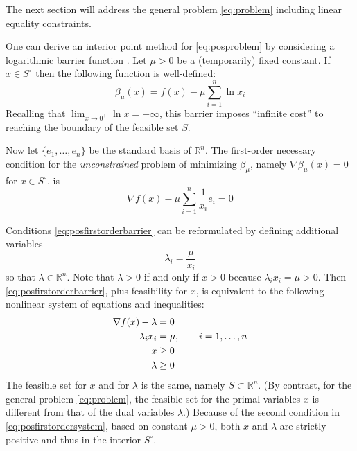 \documentclass[11pt]{article}
\newcommand{\RR}{\mathbb{R}}
\newcommand{\grad}{\nabla}
\begin{document}
The next section will address the general problem \eqref{eq:problem} including linear equality constraints.

One can derive an interior point method for \eqref{eq:posproblem} by considering a logarithmic barrier function \cite[section 16.2]{GrivaNashSofer2009}.  Let $\mu>0$ be a (temporarily) fixed constant.  If $x\in S^\circ$ then the following function is well-defined:
\begin{equation}
\beta_\mu(x) = f(x) - \mu \sum_{i=1}^n \ln x_i \label{eq:posbarrierfunction}
\end{equation}
Recalling that $\lim_{x\to 0^+} \ln x = -\infty$, this barrier imposes ``infinite cost'' to reaching the boundary of the feasible set $S$.

Now let $\{e_1,\dots,e_n\}$ be the standard basis of $\RR^n$.  The first-order necessary condition for the \emph{unconstrained} problem of minimizing $\beta_\mu$, namely $\grad \beta_\mu(x)=0$ for $x \in S^\circ$, is
\begin{equation}
\grad f(x) - \mu \sum_{i=1}^n \frac{1}{x_i} e_i = 0 \label{eq:posfirstorderbarrier}
\end{equation}

Conditions \eqref{eq:posfirstorderbarrier} can be reformulated by defining additional variables
    $$\lambda_i = \frac{\mu}{x_i}$$
so that $\lambda\in\RR^n$.  Note that $\lambda>0$ if and only if $x>0$ because $\lambda_i x_i = \mu > 0$.  Then \eqref{eq:posfirstorderbarrier}, plus feasibility for $x$, is equivalent to the following nonlinear system of equations and inequalities:
\begin{align}
\grad f(x) - \lambda &= 0 \label{eq:posfirstordersystem} \\
\lambda_i x_i &= \mu, \qquad i=1,\dots,n \notag \\
x &\ge 0 \notag \\
\lambda &\ge 0 \notag
\end{align}
The feasible set for $x$ and for $\lambda$ is the same, namely $S \subset \RR^n$.   (By contrast, for the general problem \eqref{eq:problem}, the feasible set for the primal variables $x$ is different from that of the dual variables $\lambda$.)  Because of the second condition in \eqref{eq:posfirstordersystem}, based on constant $\mu>0$, both $x$ and $\lambda$ are strictly positive and thus in the interior $S^\circ$.
\end{document}
